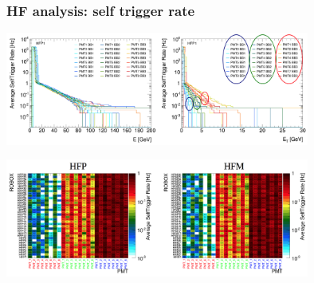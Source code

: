 \documentclass[bigger]{beamer}
\begin{document}
\begin{frame}
\frametitle{HF analysis: self trigger rate}
\label{sec-3-2-3}
\label{sec-3-2-3-1}

\centering
\includegraphics[width=0.75\textwidth]{fig/hf_local/self_trigger_1.png}
\label{sec-3-2-3-2}

\centering
\includegraphics[width=0.75\textwidth]{fig/hf_local/self_trigger_2.png}
\end{frame}
\end{document}
